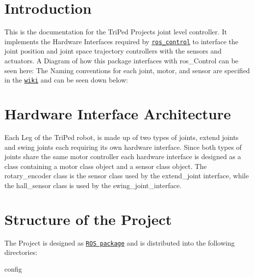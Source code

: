 \hypertarget{index_intro}{}\section{Introduction}\label{index_intro}
This is the documentation for the Tri\+Ped Projects joint level controller. It implements the Hardware Interfaces required by \href{http://wiki.ros.org/ros_control}{\tt ros\+\_\+control} to interface the joint position and joint space trajectory controllers with the sensors and actuators. A Diagram of how this package interfaces with ros\+\_\+\+Control can be seen here\+:  The Naming conventions for each joint, motor, and sensor are specified in the \href{https://github.com/TriPed-Robot/Wiki/wiki/One-Legged-Sub-Robot}{\tt wiki} and can be seen down below\+:  \hypertarget{index_arch}{}\section{Hardware Interface Architecture}\label{index_arch}
Each Leg of the Tri\+Ped robot, is made up of two types of joints, extend joints and swing joints each requiring its own hardware interface. Since both types of joints share the same motor controller each hardware interface is designed as a class containing a motor class object and a sensor class object. The rotary\+\_\+encoder class is the sensor class used by the extend\+\_\+joint interface, while the hall\+\_\+sensor class is used by the swing\+\_\+joint\+\_\+interface. \hypertarget{index_content}{}\section{Structure of the Project}\label{index_content}
The Project is designed as \href{http://wiki.ros.org/Packages}{\tt R\+OS package} and is distributed into the following directories\+:


\begin{DoxyItemize}
\item config
\end{DoxyItemize}


